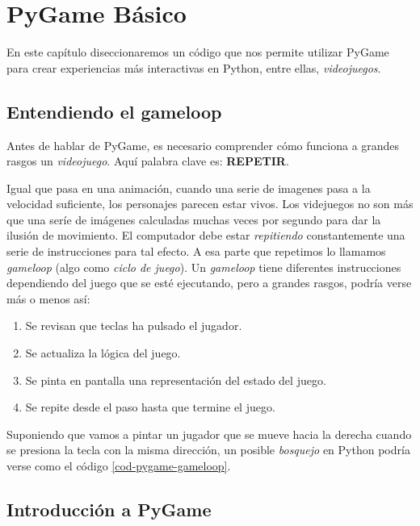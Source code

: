 \chapter{PyGame Básico}
\label{chap:motor-3d}

En este capítulo diseccionaremos un código que nos permite utilizar PyGame para crear experiencias más interactivas en Python, entre ellas, \emph{videojuegos}.

\section{Entendiendo el gameloop}

Antes de hablar de PyGame, es necesario comprender cómo funciona a grandes rasgos un \emph{videojuego}. Aquí palabra clave es: \textbf{REPETIR}.

Igual que pasa en una animación, cuando una serie de imagenes pasa a la velocidad suficiente, los personajes parecen estar vivos. Los videjuegos no son más que una seríe de imágenes calculadas muchas veces por segundo para dar la ilusión de movimiento. El computador debe estar \emph{repitiendo} constantemente una serie de instrucciones para tal efecto. A esa parte que repetimos lo llamamos \emph{gameloop} (algo como \emph{ciclo de juego}). Un \emph{gameloop} tiene diferentes instrucciones dependiendo del juego que se esté ejecutando, pero a grandes rasgos, podría verse más o menos así:

\begin{enumerate}
\item Se revisan que teclas ha pulsado el jugador.
\item Se actualiza la lógica del juego.
\item Se pinta en pantalla una representación del estado del juego.
\item Se repite desde el paso hasta que termine el juego.
\end{enumerate}

\newpage

Suponiendo que vamos a pintar un jugador que se mueve hacia la derecha cuando se presiona la tecla con la misma dirección, un posible \emph{bosquejo} en Python podría verse como el código \ref{cod-pygame-gameloop}. 





\section{Introducción a PyGame}


